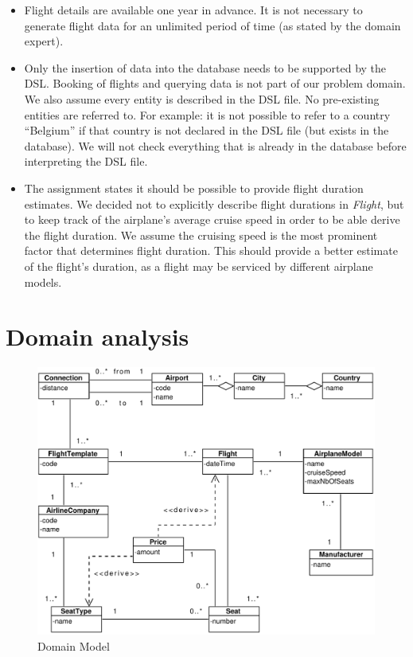 \documentclass[a4paper]{article}
\newcommand{\field}[1]{\emph{#1}}
\begin{document}
\begin{itemize}
\item Flight details are available one year in advance. It is not necessary to generate flight data for an unlimited period of time (as stated by the domain expert).\\

\item Only the insertion of data into the database needs to be supported by the DSL.
Booking of flights and querying data is not part of our problem domain.
We also assume every entity is described in the DSL file.
No pre-existing entities are referred to.
For example: it is not possible to refer to a country ``Belgium'' if that country is not declared in the DSL file (but exists in the database).
We will not check everything that is already in the database before interpreting the DSL file.\\

\item The assignment states it should be possible to provide flight duration estimates.
We decided not to explicitly describe flight durations in \field{Flight}, but to keep track of the airplane's average cruise speed in order to be able derive the flight duration.
We assume the cruising speed is the most prominent factor that determines flight duration.
This should provide a better estimate of the flight's duration, as a flight may be serviced by different airplane models.\\


\end{itemize}

\section{Domain analysis}
\label{sec:domain-analysis}

\begin{figure}[ht!]
  \includegraphics[width=1.0\textwidth]{../analysis/domainModel.pdf}
  \caption{Domain Model}\label{fig:domain-model}
\end{figure}
\end{document}
